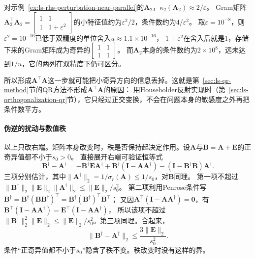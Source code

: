 \begin{example}[形成Gram矩阵时丢失的信息]
\label{ex:ls-gram-rounding-loss}
对示例~\ref{ex:ls-rhs-perturbation-near-parallel}的$\bm A_2$，$\kappa_2(\bm A_2)\approx2/\varepsilon$。
Gram矩阵$\bm A_2^\top\bm A_2=\left[\begin{smallmatrix}1&1\\1&1+\varepsilon^2\end{smallmatrix}\right]$的小特征值约为$\varepsilon^2/2$，条件数约为$4/\varepsilon^2$。
取$\varepsilon=10^{-8}$，则$\varepsilon^2=10^{-16}$已低于双精度的单位舍入$u\approx1.1\times10^{-16}$，
$1+\varepsilon^2$在舍入后就是$1$，存储下来的Gram矩阵成为奇异的$\left[\begin{smallmatrix}1&1\\1&1\end{smallmatrix}\right]$。
而$\bm A_2$本身的条件数约为$2\times10^8$，远未达到$1/u$，它的两列在双精度下仍可区分。
\end{example}

所以形成$\bm A^\top\bm A$这一步就可能把小奇异方向的信息丢掉。这就是第~\ref{sec:ls-qr-method}节的QR方法不形成$\bm A^\top\bm A$的原因：
用Householder反射实现时（第~\ref{sec:ls-orthogonalization-qr}节），它只经过正交变换，不会在问题本身的敏感度之外再把条件数平方。

\paragraph{伪逆的扰动与数值秩}

以上只改右端。矩阵本身改变时，秩是否保持起决定作用。设$\bm A$与$\bm B=\bm A+\bm E$的正奇异值都不小于$s_0>0$。
直接展开右端可验证恒等式
\[
 \bm B^\dagger-\bm A^\dagger
 =-\bm B^\dagger\bm E\bm A^\dagger
 +\bm B^\dagger(\bm I-\bm A\bm A^\dagger)
 -(\bm I-\bm B^\dagger\bm B)\bm A^\dagger .
\]
三项分别估计，其中$\lVert\bm A^\dagger\rVert_2=1/\sigma_r(\bm A)\leq1/s_0$，对$\bm B$同理。
第一项不超过$\lVert\bm B^\dagger\rVert_2\lVert\bm E\rVert_2\lVert\bm A^\dagger\rVert_2\leq\lVert\bm E\rVert_2/s_0^2$。
第二项利用Penrose条件写$\bm B^\dagger=\bm B^\dagger(\bm B\bm B^\dagger)^\top=\bm B^\dagger(\bm B^\dagger)^\top\bm B^\top$；
又因$\bm A^\top(\bm I-\bm A\bm A^\dagger)=\bm0$，有$\bm B^\top(\bm I-\bm A\bm A^\dagger)=\bm E^\top(\bm I-\bm A\bm A^\dagger)$，
所以该项不超过$\lVert\bm B^\dagger\rVert_2^2\lVert\bm E\rVert_2\leq\lVert\bm E\rVert_2/s_0^2$。第三项同理。合起来，
\begin{equation}
 \lVert\bm B^\dagger-\bm A^\dagger\rVert_2
 \leq\frac{3\lVert\bm E\rVert_2}{s_0^2}.
 \label{eq:ch06-pseudoinverse-fixed-rank-perturbation}
\end{equation}
条件“正奇异值都不小于$s_0$”隐含了秩不变。秩改变时没有这样的界。

